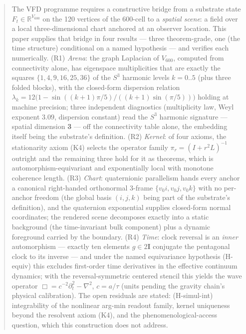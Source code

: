 \documentclass[12pt]{article}
\theoremstyle{definition}
\theoremstyle{remark}
\newcommand{\twoI}{2\mathbf{I}}
\newcommand{\Vsix}{V_{600}}
\begin{document}
\begin{abstract}
The VFD programme requires a constructive bridge from a substrate state $F_t \in \mathbb R^{\Vsix}$ on the 120 vertices of the 600-cell to a \emph{spatial scene}: a field over a local three-dimensional chart anchored at an observer location. This paper supplies that bridge in four results --- three theorem-grade, one (the time structure) conditional on a named hypothesis --- and verifies each numerically. (R1) \emph{Arena}: the graph Laplacian of $\Vsix$, computed from connectivity alone, has eigenspace multiplicities that are exactly the squares $\{1,4,9,16,25,36\}$ of the $S^3$ harmonic levels $k=0..5$ (plus three folded blocks), with the closed-form dispersion relation $\lambda_k = 12\bigl(1 - \sin((k{+}1)\pi/5)/((k{+}1)\sin(\pi/5))\bigr)$ holding at machine precision; three independent diagnostics (multiplicity law, Weyl exponent $3.09$, dispersion constant) read the $S^3$ harmonic signature --- spatial dimension \textbf{3} --- off the connectivity table alone, the embedding itself being the substrate's definition. (R2) \emph{Kernel}: of four axioms, the stationarity axiom (K4) selects the operator family $\pi_r = (I + r^2L)^{-1}$ outright and the remaining three hold for it as theorems, which is automorphism-equivariant and exponentially local with monotone coherence length. (R3) \emph{Chart}: quaternionic parallelism hands every anchor a canonical right-handed orthonormal 3-frame $\{v_0i, v_0j, v_0k\}$ with no per-anchor freedom (the global basis $(i,j,k)$ being part of the substrate's definition), and the quaternion exponential supplies closed-form normal coordinates; the rendered scene decomposes exactly into a static background (the time-invariant bulk component) plus a dynamic foreground carried by the boundary. (R4) \emph{Time}: clock reversal is an \emph{inner} automorphism --- exactly ten elements $g \in \twoI$ conjugate the pentagonal clock to its inverse --- and under the named equivariance hypothesis (H-equiv) this excludes first-order time derivatives in the effective continuum dynamics; with the reversal-symmetric centered stencil this yields the wave operator $\Box = c^{-2}\partial_t^2 - \nabla^2$, $c = a/\tau$ (units pending the gravity chain's physical calibration). The open residuals are stated: (H-simul-int) integrability of the nonlinear arg-min readout family, kernel uniqueness beyond the resolvent axiom (K4), and the phenomenological-access question, which this construction does not address.
\end{abstract}
\end{document}
